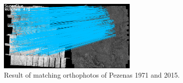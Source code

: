 \begin{figure}[htbp]
\begin{center}
{\begin{minipage}[t]{0.48\linewidth}
                \includegraphics[width=6.8cm]{images/Chapitre3/Homol-SubPatch_R270-2DRANSAC_Ortho-MEC-Malt_Tapas_1971_Ortho-MEC-Malt_2015.png}
            \end{minipage}%
        }
        \caption{Result of matching orthophotos of Pezenas 1971 and 2015.}
        \label{Match result}
    \end{center}
\end{figure} 


\begin{figure}[htbp]
    \begin{center}
\end{center}
\end{figure}

